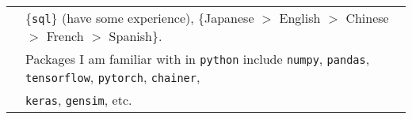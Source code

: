 \documentclass[utf8,letterpaper,oneside]{article}
\begin{document}
\begin{center}
\begin{tabular}{l l}
                           & \{{\texttt{sql}}\} (have some experience), \{Japanese $>$ English $>$ Chinese $>$ French $>$ Spanish\}.                                          \\
                           & Packages I am familiar with in \texttt{python} include \texttt{numpy}, \texttt{pandas}, \texttt{tensorflow}, \texttt{pytorch}, \texttt{chainer}, \\
                           & \texttt{keras}, \texttt{gensim}, etc.                                                                                                            
 \end{tabular}
\end{center}
\end{document}
